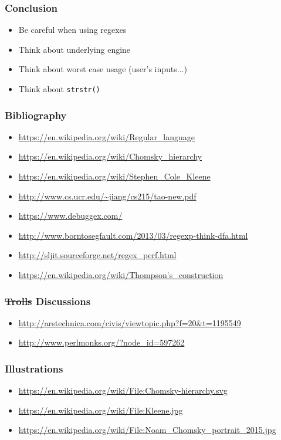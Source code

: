 \documentclass[aspectratio=169,xcolor=table]{beamer}
\newcommand{\ctexttt}[1]{\colorbox{cverbbg}{\texttt{#1}}}
\begin{document}
\begin{frame}
  \frametitle{Conclusion}
  \begin{itemize}
    \item Be careful when using regexes
    \item Think about underlying engine
    \item Think about worst case usage (user's inputs...)
    \item Think about \ctexttt{strstr()}
  \end{itemize}
\end{frame}


\begin{frame}
  \frametitle{Bibliography}
  \begin{itemize}
  \item \url{https://en.wikipedia.org/wiki/Regular\_language}
  \item \url{https://en.wikipedia.org/wiki/Chomsky\_hierarchy}
  \item \url{https://en.wikipedia.org/wiki/Stephen\_Cole\_Kleene}
  \item \url{http://www.cs.ucr.edu/~jiang/cs215/tao-new.pdf}
  \item \url{https://www.debuggex.com/}
  \item \url{http://www.borntosegfault.com/2013/03/regexp-think-dfa.html}
  \item \url{http://sljit.sourceforge.net/regex\_perf.html}
  \item \url{https://en.wikipedia.org/wiki/Thompson's\_construction}
  \end{itemize}
\end{frame}


\begin{frame}
  \frametitle{\sout{Trolls} Discussions}
  \begin{itemize}
  \item \url{http://arstechnica.com/civis/viewtopic.php?f=20\&t=1195549}
  \item \url{http://www.perlmonks.org/?node\_id=597262}
  \end{itemize}
\end{frame}

\begin{frame}
  \frametitle{Illustrations}
  \begin{itemize}
  \item \url{https://en.wikipedia.org/wiki/File:Chomsky-hierarchy.svg}
  \item \url{https://en.wikipedia.org/wiki/File:Kleene.jpg}
  \item \url{https://en.wikipedia.org/wiki/File:Noam\_Chomsky\_portrait\_2015.jpg}
  \end{itemize}
\end{frame}
\end{document}
